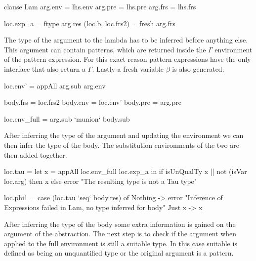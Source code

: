 \begin{code}
clause Lam
    arg.env = lhs.env
    arg.pre = lhs.pre
    arg.frs = lhs.frs
   
    loc.exp_a = ftype arg.res
    (loc.b, loc.frs2) = fresh arg.frs
\end{code}
The type of the argument to the lambda has to be inferred before anything else. This argument can contain patterns, which are returned inside the $\Gamma$ environment of the pattern expression. For this exact reason pattern expressions have the only interface that also return a $\Gamma$. Lastly a fresh variable $\beta$ is also generated.
       
\begin{code}
   loc.env'          = appAll arg.sub arg.env
      
   body.frs = loc.frs2
   body.env = loc.env'
   body.pre = arg.pre
       
   loc.env_full = arg.sub `munion` body.sub
\end{code}
After inferring the type of the argument and updating the environment we can then infer the type of the body. The substitution environments of the two are then added together.     

\begin{code}
   loc.tau = let x = appAll loc.env_full loc.exp_a
             in if isUnQualTy x || not (isVar loc.arg)
                   then x
                   else error "The resulting type is not a Tau type"
                       
   loc.phi1 = case (loc.tau `seq` body.res) of
                Nothing -> error "Inference of Expressions failed in Lam, no type inferred for body"
                Just x  -> x
\end{code}
After inferring the type of the body some extra information is gained on the argument of the abstraction. The next step is to check if the argument when applied to the full environment is still a suitable type. In this case suitable is defined as being an unquantified type or the original argument is a pattern.

